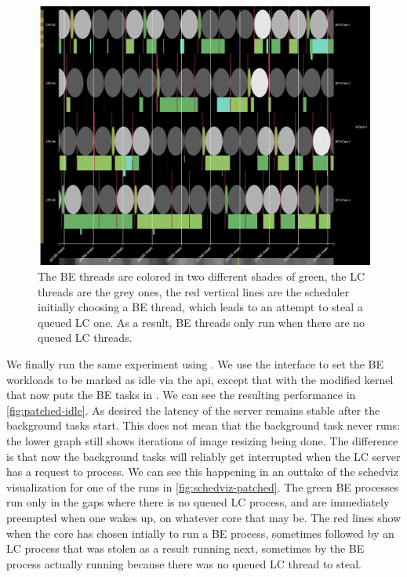 \begin{figure}[t]
    \centering
    \includegraphics[width=\columnwidth]{graphs/schedviz-patched.png}
    \caption{The BE threads are colored in two different shades of green, the LC
    threads are the grey ones, the red vertical lines are the scheduler
    initially choosing a BE thread, which leads to an attempt to steal a queued
    LC one. As a result, BE threads only run when there are no queued LC
    threads.}\label{fig:schedviz-patched}
\end{figure}

We finally run the same experiment using \schedbe{}. We use the \cgroups{}
interface to set the BE workloads to be marked as idle via the \cgroups{} api,
except that with the modified kernel that now puts the BE tasks in \schedbe{}.
We can see the resulting performance in \autoref{fig:patched-idle}. As desired
the latency of the server remains stable after the background tasks start. This
does not mean that the background task never runs: the lower graph still shows
iterations of image resizing being done. The difference is that now the
background tasks will reliably get interrupted when the LC server has a request
to process. We can see this happening in an outtake of the schedviz
visualization for one of the runs in \autoref{fig:schedviz-patched}. The green
BE processes run only in the gaps where there is no queued LC process, and are
immediately preempted when one wakes up, on whatever core that may be. The red
lines show when the core has chosen intially to run a BE process, sometimes
followed by an LC process that was stolen as a result running next, sometimes by
the BE process actually running because there was no queued LC thread to steal.



